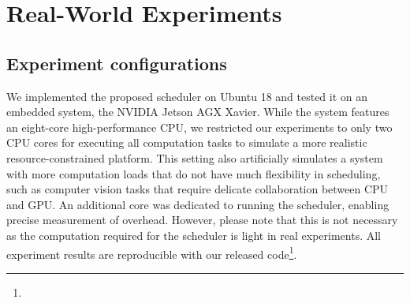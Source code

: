 
    \section{Real-World Experiments}
	\subsection{Experiment configurations}
        
    We implemented the proposed scheduler on Ubuntu 18 and tested it on an embedded system, the NVIDIA Jetson AGX Xavier. While the system features an eight-core high-performance CPU, we restricted our experiments to only two CPU cores for executing all computation tasks to simulate a more realistic resource-constrained platform. This setting also artificially simulates a system with more computation loads that do not have much flexibility in scheduling, such as computer vision tasks that require delicate collaboration between CPU and GPU.
    An additional core was dedicated to running the scheduler, enabling precise measurement of overhead. However, please note that this is not necessary as the computation required for the scheduler is light in real experiments. All experiment results are reproducible with our released code\footnote{\githubLink{}}. 
    
